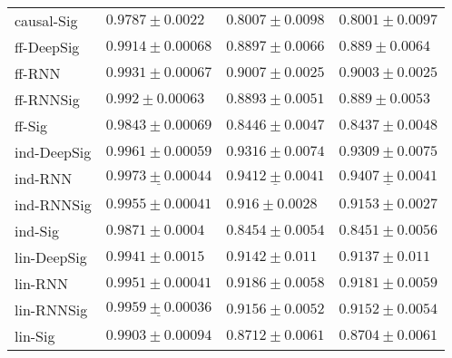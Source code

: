 \begin{tabular}{llll}
causal-Sig     &                            $ 0.9787 \pm 0.0022 $ &                           $ 0.8007 \pm 0.0098 $ &                           $ 0.8001 \pm 0.0097 $ \\
ff-DeepSig     &                           $ 0.9914 \pm 0.00068 $ &                           $ 0.8897 \pm 0.0066 $ &                            $ 0.889 \pm 0.0064 $ \\
ff-RNN         &                           $ 0.9931 \pm 0.00067 $ &                           $ 0.9007 \pm 0.0025 $ &                           $ 0.9003 \pm 0.0025 $ \\
ff-RNNSig      &                            $ 0.992 \pm 0.00063 $ &                           $ 0.8893 \pm 0.0051 $ &                            $ 0.889 \pm 0.0053 $ \\
ff-Sig         &                           $ 0.9843 \pm 0.00069 $ &                           $ 0.8446 \pm 0.0047 $ &                           $ 0.8437 \pm 0.0048 $ \\
ind-DeepSig    &               $  \mathbf{ 0.9961 \pm 0.00059 } $ &               $  \mathbf{ 0.9316 \pm 0.0074 } $ &               $  \mathbf{ 0.9309 \pm 0.0075 } $ \\
ind-RNN        &  $  \mathbf{ \underline{ 0.9973 \pm 0.00044 }} $ &  $  \mathbf{ \underline{ 0.9412 \pm 0.0041 }} $ &  $  \mathbf{ \underline{ 0.9407 \pm 0.0041 }} $ \\
ind-RNNSig     &                           $ 0.9955 \pm 0.00041 $ &                            $ 0.916 \pm 0.0028 $ &                           $ 0.9153 \pm 0.0027 $ \\
ind-Sig        &                            $ 0.9871 \pm 0.0004 $ &                           $ 0.8454 \pm 0.0054 $ &                           $ 0.8451 \pm 0.0056 $ \\
lin-DeepSig    &                            $ 0.9941 \pm 0.0015 $ &                            $ 0.9142 \pm 0.011 $ &                            $ 0.9137 \pm 0.011 $ \\
lin-RNN        &                           $ 0.9951 \pm 0.00041 $ &                           $ 0.9186 \pm 0.0058 $ &                           $ 0.9181 \pm 0.0059 $ \\
lin-RNNSig     &            $  \underline{ 0.9959 \pm 0.00036 } $ &                           $ 0.9156 \pm 0.0052 $ &                           $ 0.9152 \pm 0.0054 $ \\
lin-Sig        &                           $ 0.9903 \pm 0.00094 $ &                           $ 0.8712 \pm 0.0061 $ &                           $ 0.8704 \pm 0.0061 $ \\

\end{tabular}
